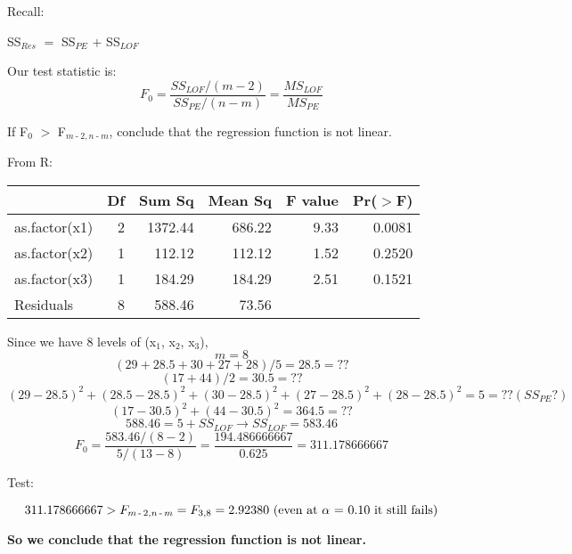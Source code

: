 \documentclass{article}
\newcommand{\mt}[1]{\ensuremath{#1}}
\newcommand{\afa}{\mt{\alpha} }
\newcommand{\lra}{ \mt{\longrightarrow} } %
\newcommand{\ps}{\mt{\operatorname{+}} }
\newcommand{\ms}{\mt{\operatorname{-}} }
\newcommand{\gr}{\mt{\operatorname{>}} }
\newcommand{\eql}{ \mt{\operatorname{=}} }
\newcommand{\uw}[2]{#1\mt{_{#2}}}
\newcommand{\eqn}[1]{\[#1\]}
\begin{document}
{{Recall:

\uw{SS}{Res} \eql \uw{SS}{PE} \ps \uw{SS}{LOF}

Our test statistic is:
\eqn{F_0 = \frac{SS_{LOF} / (m - 2)}{SS_{PE} / (n - m)} = \frac{MS_{LOF}}{MS_{PE}}}

If \uw{F}{0} \gr \uw{F}{m \ms 2, n \ms m}, conclude that the regression function is not linear.

From R:

\begin{table}[ht]
\centering
\begin{tabular}{lrrrrr}
  \hline
 & Df & Sum Sq & Mean Sq & F value & Pr($>$F) \\ 
  \hline
as.factor(x1) & 2 & 1372.44 & 686.22 & 9.33 & 0.0081 \\ 
  as.factor(x2) & 1 & 112.12 & 112.12 & 1.52 & 0.2520 \\ 
  as.factor(x3) & 1 & 184.29 & 184.29 & 2.51 & 0.1521 \\ 
  Residuals & 8 & 588.46 & 73.56 &  &  \\ 
   \hline
\end{tabular}
\end{table}

Since we have 8 levels of (\uw{x}{1}, \uw{x}{2}, \uw{x}{3}),
\eqn{m = 8}
\eqn{(29 + 28.5 + 30 + 27 + 28) / 5 = 28.5 = ??}
\eqn{(17 + 44) / 2 = 30.5 = ??}
\eqn{(29 - 28.5)^2 + (28.5 - 28.5)^2 + (30 - 28.5)^2 + (27 - 28.5)^2 + (28 - 28.5)^2 \eql 5 = ?? (SS_{PE}?)}
\eqn{(17 - 30.5)^2 + (44 - 30.5)^2 = 364.5 = ??}
\eqn{588.46 = 5 + SS_{LOF} \lra SS_{LOF} = 583.46}
\eqn{F_0 = \frac{583.46 / (8 - 2)}{5 / (13 - 8)} = \frac{194.486666667}{0.625} = 311.178666667}

Test:

\eqn{311.178666667 > \uw{F}{m \ms 2, n \ms m} = F_{3, 8} = 2.92380 \textrm{ (even at \afa \eql 0.10 it still fails)}}

\textbf{So we conclude that the regression function is not linear.}

}

}

\newpage
\end{document}
